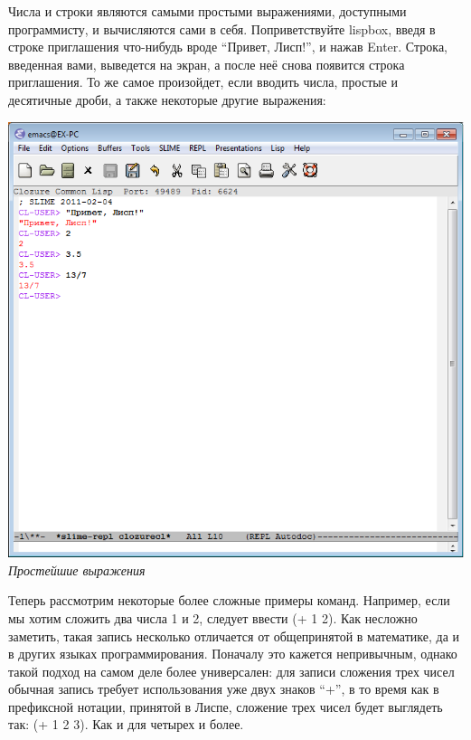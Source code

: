 \documentclass[a4paper, 10pt, titlepage, twoside]{article}
\begin{document}
Числа и строки являются самыми простыми выражениями, доступными программисту, и вычисляются сами в себя. Поприветствуйте lispbox, введя в строке приглашения что-нибудь вроде ``Привет, Лисп!'', и нажав Enter. Строка, введенная вами, выведется на экран, а после неё снова появится строка приглашения. То же самое произойдет, если вводить числа, простые и десятичные дроби, а также некоторые другие выражения:
\begin{center}
  \includegraphics[scale=.7]{lispbox_toplevel}\\
  \small{\textit{Простейшие выражения}}
\end{center}
Теперь рассмотрим некоторые более сложные примеры команд. Например, если мы хотим сложить два числа 1 и 2, следует ввести (+ 1 2). Как несложно заметить, такая запись несколько отличается от общепринятой в математике, да и в других языках программирования. Поначалу это кажется непривычным, однако такой подход на самом деле более универсален: для записи сложения трех чисел обычная запись требует использования уже двух знаков ``+'', в то время как в префиксной нотации, принятой в Лиспе, сложение трех чисел будет выглядеть так: (+ 1 2 3). Как и для четырех и более.
\end{document}
